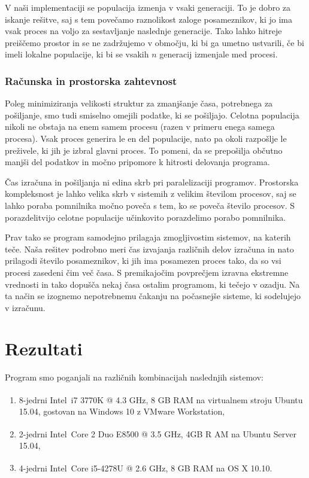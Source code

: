 \documentclass[a4paper,12pt]{book}
\begin{document}
V naši implementaciji se populacija izmenja v vsaki generaciji. To je dobro za iskanje rešitve, saj s tem povečamo raznolikost zaloge posameznikov, ki jo ima vsak proces na voljo za sestavljanje naslednje generacije. Tako lahko hitreje preiščemo prostor in se ne zadržujemo v območju, ki bi ga umetno ustvarili, če bi imeli lokalne populacije, ki bi se vsakih $n$ generacij izmenjale med procesi. 


\subsection{Računska in prostorska zahtevnost}
Poleg minimiziranja velikosti struktur za zmanjšanje časa, potrebnega za pošiljanje, smo tudi smiselno omejili podatke, ki se pošiljajo. Celotna populacija nikoli ne obstaja na enem samem procesu (razen v primeru enega samega procesa). Vsak proces generira le en del populacije, nato pa okoli razpošlje le preživele, ki jih je izbral glavni proces. To pomeni, da se prepošilja občutno manjši del podatkov in močno pripomore k hitrosti delovanja programa. 

Čas izračuna in pošiljanja ni edina skrb pri paralelizaciji programov. Prostorska kompleksnost je lahko velika skrb v sistemih z velikim številom procesov, saj se lahko poraba pomnilnika močno poveča s tem, ko se poveča število procesov. S porazdelitvijo celotne populacije učinkovito porazdelimo porabo pomnilnika. 

Prav tako se program samodejno prilagaja zmogljivostim sistemov, na katerih teče. Naša rešitev podrobno meri čas izvajanja različnih delov izračuna in nato prilagodi število posameznikov, ki jih ima posamezen proces tako, da so vsi procesi zasedeni čim več časa. S premikajočim povprečjem izravna ekstremne vrednosti in tako dopušča nekaj časa ostalim programom, ki tečejo v ozadju. Na ta način se izognemo nepotrebnemu čakanju na počasnejše sisteme, ki sodelujejo v izračunu. 



\chapter{Rezultati}
Program smo poganjali na različnih kombinacijah naslednjih sistemov:
\begin{enumerate}
\item 8-jedrni Intel\textsuperscript\textregistered\ i7 3770K @ 4.3 GHz, 8 GB RAM na virtualnem stroju Ubuntu 15.04, gostovan na Windows 10 z VMware Workstation, \label{computer:virtual}
\item 2-jedrni Intel\textsuperscript\textregistered\ Core 2 Duo E8500 @ 3.5 GHz, 4GB R AM na Ubuntu Server 15.04, \label{computer:old}
\item 4-jedrni Intel\textsuperscript\textregistered\ Core i5-4278U @ 2.6 GHz, 8 GB RAM na OS X 10.10. \label{computer:laptop}
\end{enumerate}
\end{document}
